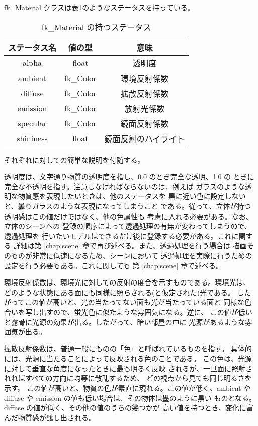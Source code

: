 fk\_Material クラスは表\ref{tbl:fkMaterial1}のようなステータスを持っている。

\begin{table}[H]
\caption{fk\_Material の持つステータス}
\label{tbl:fkMaterial1}
\begin{center}
\begin{tabular}{|c|c|c|}
\hline
ステータス名 & 値の型 & 意味 \\ \hline \hline
alpha & float & 透明度 \\ \hline
ambient & fk\_Color & 環境反射係数 \\ \hline
diffuse & fk\_Color & 拡散反射係数 \\ \hline
emission & fk\_Color & 放射光係数 \\ \hline
specular & fk\_Color & 鏡面反射係数 \\ \hline
shininess & float & 鏡面反射のハイライト \\ \hline
\end{tabular}
\end{center}
\end{table}
それぞれに対しての簡単な説明を付随する。

透明度は、文字通り物質の透明度を指し、0.0 のとき完全な透明、1.0 の
ときに完全な不透明を指す。注意しなければならないのは、例えば
ガラスのような透明な物質感を表現したいときは、他のステータスを
黒に近い色に設定しないと、曇りガラスのような表現になってしまうこと
である。従って、立体が持つ透明感はこの値だけではなく、他の色属性も
考慮に入れる必要がある。なお、立体のシーンへの
登録の順序によって透過処理の有無が変わってしまうので、透過処理を
行いたいモデルはできるだけ後に登録する必要がある。これに関する
詳細は第 \ref{chap:scene} 章で再び述べる。また、透過処理を行う場合は
描画そのものが非常に低速になるため、シーンにおいて
透過処理を実際に行うための設定を行う必要もある。これに関しても
第 \ref{chap:scene} 章で述べる。

環境反射係数は、環境光に対しての反射の度合を示すものである。環境光は、
どのような状態にある面にも同様に照らされる(と仮定された)光である。
したがってこの値が高いと、光の当たってない面も光が当たっている面と
同様な色合いを写し出すので、蛍光色に似たような雰囲気になる。逆に、
この値が低いと露骨に光源の効果が出る。したがって、暗い部屋の中に
光源があるような雰囲気が出る。

拡散反射係数は、普通一般にものの「色」と呼ばれているものを指す。
具体的には、光源に当たることによって反映される色のことである。
この色は、光源に対して垂直な角度になったときに最も明るく反映
されるが、一旦面に照射されればすべての方向に均等に散乱するため、
どの視点から見ても同じ明るさを示す。
この値が高いと、物質の色が素直に現れる。この値が低く、ambient や
diffuse や emission の値も低い場合は、その物体は墨のように黒い
ものとなる。diffuse の値が低く、その他の値のうちの幾つかが
高い値を持つとき、変化に富んだ物質感が醸し出される。

